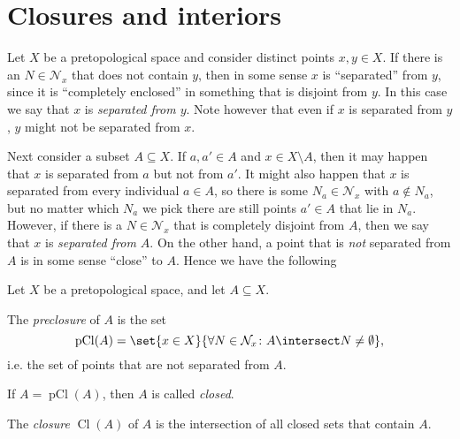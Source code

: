 \documentclass[article, a4paper, 11pt, oneside]{memoir}
\numberwithin{equation}{chapter}
\newcommand{\calN}{\mathcal{N}}
\newcommand{\nhoods}[1]{\calN_{#1}}
\newcommand{\pCl}[1]{\operatorname{pCl}(#1)}
\renewcommand{\closure}[1]{\operatorname{Cl}(#1)}
\begin{document}
\section{Closures and interiors}

Let $X$ be a pretopological space and consider distinct points $x,y \in X$. If there is an $N \in \nhoods{x}$ that does not contain $y$, then in some sense $x$ is \enquote{separated} from $y$, since it is \enquote{completely enclosed} in something that is disjoint from $y$. In this case we say that $x$ is \emph{separated from $y$}. Note however that even if $x$ is separated from $y$, $y$ might not be separated from $x$.

Next consider a subset $A \subseteq X$. If $a,a' \in A$ and $x \in X \setminus A$, then it may happen that $x$ is separated from $a$ but not from $a'$. It might also happen that $x$ is separated from every individual $a \in A$, so there is some $N_a \in \nhoods{x}$ with $a \not\in N_a$, but no matter which $N_a$ we pick there are still points $a' \in A$ that lie in $N_a$. However, if there is a $N \in \nhoods{x}$ that is completely disjoint from $A$, then we say that $x$ is \emph{separated from $A$}. On the other hand, a point that is \emph{not} separated from $A$ is in some sense \enquote{close} to $A$. Hence we have the following

\begin{definition}
    Let $X$ be a pretopological space, and let $A \subseteq X$.
    \begin{enumdef}
        \item The \emph{preclosure} of $A$ is the set
        \begin{equation*}
            \pCl{A}
                = \set{x \in X}{\forall N \in \nhoods{x} \colon A \intersect N \neq \emptyset},
        \end{equation*}
        i.e. the set of points that are not separated from $A$.

        \item If $A = \pCl{A}$, then $A$ is called \emph{closed}.
        
        \item The \emph{closure} $\closure{A}$ of $A$ is the intersection of all closed sets that contain $A$.
    \end{enumdef}
\end{definition}
\end{document}
